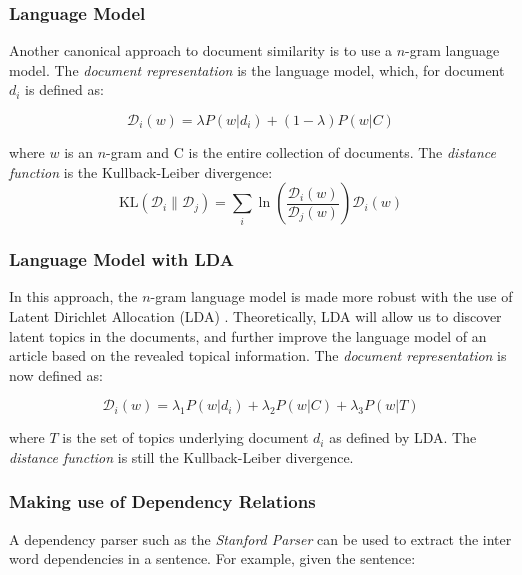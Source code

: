 \documentclass[11pt]{article}
\begin{document}
\subsubsection*{Language Model}

Another canonical approach to document similarity is to use a $n$-gram language model.  The \emph{document representation} is the language model, which, for document $d_i$ is defined as:

\begin{equation}
\mathcal{D}_i(w) = \lambda P(w|d_i) + (1 - \lambda) P(w| C)
\end{equation}

where $w$ is an $n$-gram and C is the entire collection of documents. The \emph{distance function} is the Kullback-Leiber divergence: 
\begin{equation}
{\mathrm{KL}}(\mathcal{D}_i\|\mathcal{D}_j) = \sum_i \ln\left(\frac{\mathcal{D}_i(w)}{\mathcal{D}_j(w)}\right) \mathcal{D}_i(w)
\end{equation}

\subsubsection*{Language Model with LDA}

In this approach, the $n$-gram language model is made more robust with the use of Latent Dirichlet Allocation (LDA) \cite{Blei2003}. Theoretically, LDA will allow us to discover latent topics in the documents, and further improve the language model of an article based on the revealed topical information.  The \emph{document representation} is now defined as: 

\begin{equation}
\mathcal{D}_i(w) = \lambda_1 P(w|d_i) + \lambda_2 P(w| C) + \lambda_3 P(w|T)
\end{equation}

where $T$ is the set of topics underlying document $d_i$ as defined by LDA. The \emph{distance function} is still the Kullback-Leiber divergence. 

\subsubsection{Making use of Dependency Relations} \label{sec:DependencyParsing}

A dependency parser such as the \emph{Stanford Parser} \cite{StanfordParser} can be used to extract the inter word dependencies in a sentence. For example, given the sentence:
\end{document}
